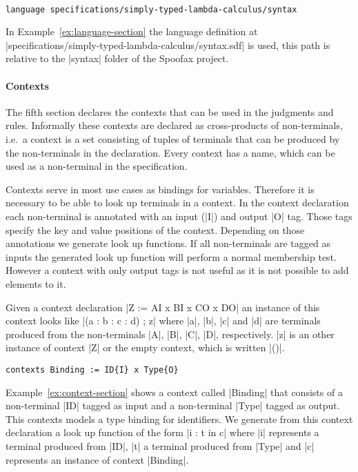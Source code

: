 \begin{example}{~}
\begin{lstlisting}[language=sltc]
language specifications/simply-typed-lambda-calculus/syntax
\end{lstlisting}
\label{ex:language-section}
\end{example}

In Example~\ref{ex:language-section} the language definition at
\code|specifications/simply-typed-lambda-calculus/syntax.sdf|
is used, this path is relative to the \code|syntax| folder of the Spoofax
project.

\paragraph{Contexts} The fifth section declares the contexts that can
be used in the judgments and rules. Informally these contexts are
declared as cross-products of non-terminals, i.e.\ a context is a set
consisting of tuples of terminals that can be produced by the
non-terminals in the declaration. Every context has a name, which can
be used as a non-terminal in the specification.

Contexts serve in most use cases as bindings for variables. Therefore
it is necessary to be able to look up terminals in a context. In the
context declaration each non-terminal is annotated with an input
(\code|{I}|) and output \code|{O}| tag. Those tags specify the key and
value positions of the context. Depending on those annotations we
generate look up functions. If all non-terminals are tagged as inputs
the generated look up function will perform a normal membership
test. However a context with only output tags is not useful as it is
not possible to add elements to it.

Given a context declaration \code|Z := A{I} x B{I} x C{O} x D{O}| an
instance of this context looks like \code|(a : b : c : d) ; z| where
\code|a|, \code|b|, \code|c| and \code|d| are terminals produced from
the non-terminals \code|A|, \code|B|, \code|C|, \code|D|,
respectively. \code|z| is an other instance of context \code|Z| or the
empty context, which is written \code|()|.

\begin{example}
\begin{lstlisting}[language=sltc]
contexts Binding := ID{I} x Type{O}
\end{lstlisting}
\label{ex:context-section}
\end{example}

Example~\ref{ex:context-section} shows a context called \code|Binding|
that consists of a non-terminal \code|ID| tagged as input and a
non-terminal \code|Type| tagged as output. This contexts models a type
binding for identifiers. We generate from this context declaration a
look up function of the form \code|i : t in c| where \code|i|
represents a terminal produced from \code|ID|, \code|t| a terminal
produced from \code|Type| and \code|c| represents an instance of
context \code|Binding|. 

